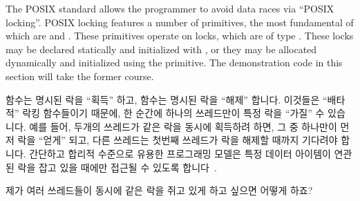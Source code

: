 The POSIX standard allows the programmer to avoid data races via
``POSIX locking''.
POSIX locking features a number of primitives, the most fundamental
of which are  and .
These primitives operate on locks, which are of type .
These locks may be declared statically and initialized with
, or they may be allocated dynamically
and initialized using the  primitive.
The demonstration code in this section will take the former course.
\fi

 함수는 명시된 락을 ``획득'' 하고,
 함수는 명시된 락을 ``해제'' 합니다.
이것들은 ``배타적'' 락킹 함수들이기 때문에, 한 순간에 하나의 쓰레드만이 특정
락을 ``가질'' 수 있습니다.
예를 들어, 두개의 쓰레드가 같은 락을 동시에 획득하려 하면, 그 중 하나만이
먼저 락을 ``얻게'' 되고, 다른 쓰레드는 첫번째 쓰레드가 락을 해제할 때까지
기다려야 합니다.
간단하고 합리적 수준으로 유용한 프로그래밍 모델은 특정 데이터 아이템이 연관된
락을 잡고 있을 때에만 접근될 수 있도록 합니다~\cite{Hoare74}.

\QuickQuiz{}
	제가 여러 쓰레드들이 동시에 같은 락을 쥐고 있게 하고 싶으면 어떻게
	하죠?
	\iffalse

